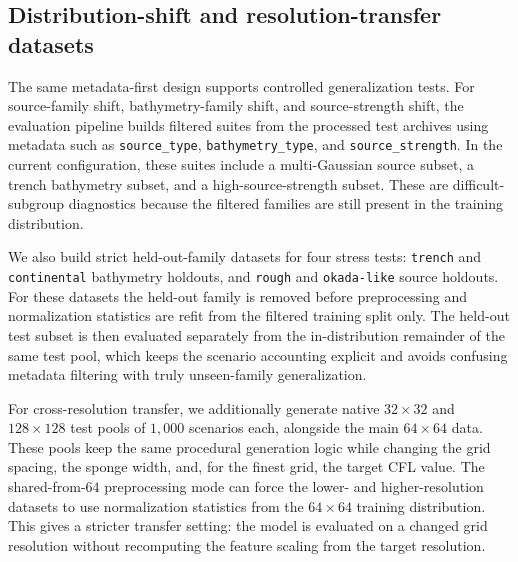 \subsection{Distribution-shift and resolution-transfer datasets}
\label{subsec:shift-resolution-data}

The same metadata-first design supports controlled generalization tests. For source-family shift, bathymetry-family shift, and source-strength shift, the evaluation pipeline builds filtered suites from the processed test archives using metadata such as \texttt{source\_type}, \texttt{bathymetry\_type}, and \texttt{source\_strength}. In the current configuration, these suites include a multi-Gaussian source subset, a trench bathymetry subset, and a high-source-strength subset. These are difficult-subgroup diagnostics because the filtered families are still present in the training distribution.

We also build strict held-out-family datasets for four stress tests: \texttt{trench} and \texttt{continental} bathymetry holdouts, and \texttt{rough} and \texttt{okada-like} source holdouts. For these datasets the held-out family is removed before preprocessing and normalization statistics are refit from the filtered training split only. The held-out test subset is then evaluated separately from the in-distribution remainder of the same test pool, which keeps the scenario accounting explicit and avoids confusing metadata filtering with truly unseen-family generalization.

For cross-resolution transfer, we additionally generate native $32\times32$ and $128\times128$ test pools of $1{,}000$ scenarios each, alongside the main $64\times64$ data. These pools keep the same procedural generation logic while changing the grid spacing, the sponge width, and, for the finest grid, the target CFL value. The shared-from-$64$ preprocessing mode can force the lower- and higher-resolution datasets to use normalization statistics from the $64\times64$ training distribution. This gives a stricter transfer setting: the model is evaluated on a changed grid resolution without recomputing the feature scaling from the target resolution.
